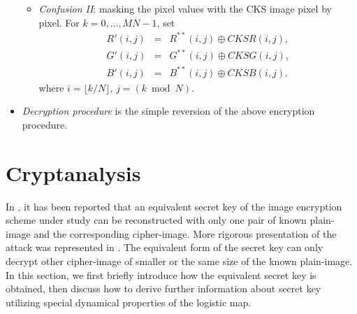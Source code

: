 \documentclass[twocolumn]{svjour3}
\begin{document}
\begin{itemize}
\begin{itemize}
\item
\textit{Confusion II}: masking the pixel values with the CKS image
pixel by pixel.
For $k=0,\ldots,MN-1$, set
\begin{eqnarray*}
R'(i,j) & = & R^{**}(i,j)\oplus \textit{CKSR}(i,j),\\
G'(i,j) & = & G^{**}(i,j)\oplus \textit{CKSG}(i,j),\\
B'(i,j) & = & B^{**}(i,j)\oplus \textit{CKSB}(i,j).
\end{eqnarray*}
where $i=\lfloor k/N\rfloor$, $j=(k\bmod N)$.
\end{itemize}

\item
\textit{Decryption procedure} is the simple reversion of the above
encryption procedure.
\end{itemize}

\section{Cryptanalysis}
\label{sec:cryptanalysis}

In \cite[Sec.~4.2]{Rhouma:BreakPareek:CNSNS10}, it has been reported
that an equivalent secret key of the image encryption scheme under study can be reconstructed with only one
pair of known plain-image and the corresponding cipher-image. More rigorous presentation of the attack was represented in \cite[Sec.~3.1]{Li:BreakPareek2:CNSNS11}. The equivalent form of the secret key can only decrypt other cipher-image of smaller or the same size of
the known plain-image. In this section, we first briefly introduce how the equivalent secret key is obtained, then discuss how to derive
further information about secret key utilizing special dynamical properties of the logistic map.
\end{document}
